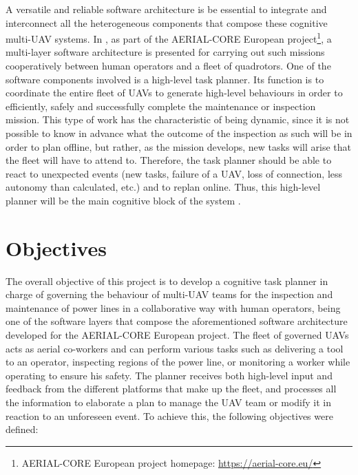 A versatile and reliable software architecture is be essential to integrate and interconnect all the heterogeneous components that compose these cognitive multi-\gls{UAV} systems. In \cite{AerialCoreMulti-Layer}, as part of the AERIAL-CORE European project\footnote{AERIAL-CORE European project homepage: \url{https://aerial-core.eu/}}, a multi-layer software architecture is presented for carrying out such missions cooperatively between human operators and a fleet of quadrotors. One of the software components involved is a high-level task planner. Its function is to coordinate the entire fleet of \glspl{UAV} to generate high-level behaviours in order to efficiently, safely and successfully complete the maintenance or inspection mission. This type of work has the characteristic of being dynamic, since it is not possible to know in advance what the outcome of the inspection as such will be in order to plan offline, but rather, as the mission develops, new tasks will arise that the fleet will have to attend to. Therefore, the task planner should be able to react to unexpected events (new tasks, failure of a \gls{UAV}, loss of connection, less autonomy than calculated, etc.) and to replan online. Thus, this high-level planner will be the main cognitive block of the system \cite{AerialCoreMulti-Layer}.

\section{Objectives}
\label{sec:Objectives}
The overall objective of this project is to develop a cognitive task planner in charge of governing the behaviour of multi-\gls{UAV} teams for the inspection and maintenance of power lines in a collaborative way with human operators, being one of the software layers that compose the aforementioned software architecture \cite{AerialCoreMulti-Layer} developed for the AERIAL-CORE European project. The fleet of governed \glspl{UAV} acts as aerial co-workers and can perform various tasks such as delivering a tool to an operator, inspecting regions of the power line, or monitoring a worker while operating to ensure his safety. The planner receives both high-level input and feedback from the different platforms that make up the fleet, and processes all the information to elaborate a plan to manage the \gls{UAV} team or modify it in reaction to an unforeseen event. To achieve this, the following objectives were defined:

